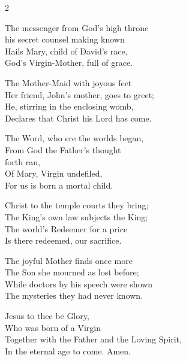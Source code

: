 \documentclass[12pt]{book}
\begin{document}
%
%   


\chapterlateng



\hymnlateng



\begin{multicols}{2}
\begin{enpars}
\raggedcolumns
The messenger from God's high throne\\
his secret counsel making known\\
Hails Mary, child of David's race,\\
God's Virgin-Mother, full of grace.

The Mother-Maid with joyous feet\\
Her friend, John's mother, goes to greet;\\
He, stirring in the enclosing womb,\\
Declares that Christ his Lord has come.

The Word, who ere the worlds began,\\
From God the Father's thought \\forth ran,\\
Of Mary, Virgin undefiled,\\
For us is born a mortal child.
\columnbreak

Christ to the temple courts they bring;\\
The King's own law subjects the King;\\
The world's Redeemer for a price\\
Is there redeemed, our sacrifice.

The joyful Mother finds once more\\
The Son she mourned as lost before;\\
While doctors by his speech were shown\\
The mysteries they had never known.

Jesus to thee be Glory,\\
Who was born of a Virgin\\
Together with the Father and the Loving Spirit,\\
In the eternal age to come. Amen.
\end{enpars}
\end{multicols}
\end{document}
